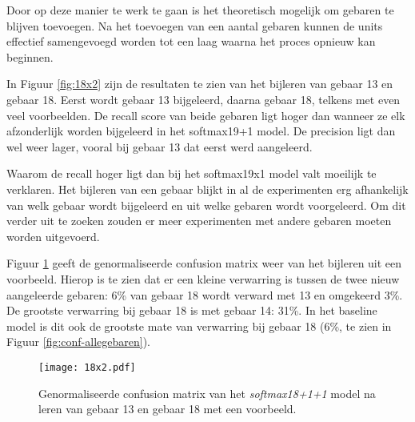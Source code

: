 \npar Door op deze manier te werk te gaan is het theoretisch mogelijk om gebaren te blijven toevoegen. Na het toevoegen van een aantal gebaren kunnen de units effectief samengevoegd worden tot een laag waarna het proces opnieuw kan beginnen.

\npar In Figuur \ref{fig:18x2} zijn de resultaten te zien van het bijleren van gebaar 13 en gebaar 18. Eerst wordt gebaar 13 bijgeleerd, daarna gebaar 18, telkens met even veel voorbeelden. De recall score van beide gebaren ligt hoger dan wanneer ze elk afzonderlijk worden bijgeleerd in het softmax19+1 model. De precision ligt dan wel weer lager, vooral bij gebaar 13 dat eerst werd aangeleerd.

\npar Waarom de recall hoger ligt dan bij het softmax19x1 model valt moeilijk te verklaren. Het bijleren van een gebaar blijkt in al de experimenten erg afhankelijk van welk gebaar wordt bijgeleerd en uit welke gebaren wordt voorgeleerd. Om dit verder uit te zoeken zouden er meer experimenten met andere gebaren moeten worden uitgevoerd.

\npar Figuur \ref{fig:conf-18x2} geeft de genormaliseerde confusion matrix weer van het bijleren uit een voorbeeld. Hierop is te zien dat er een kleine verwarring is tussen de twee nieuw aangeleerde gebaren: 6\% van gebaar 18 wordt verward met 13 en omgekeerd 3\%. De grootste verwarring bij gebaar 18 is met gebaar 14: 31\%. In het baseline model is dit ook de grootste mate van verwarring bij gebaar 18 (6\%, te zien in Figuur \ref{fig:conf-allegebaren}).


\begin{figure}
	\centering
	\texttt{[image: 18x2.pdf]}
	\caption{Precision en recall na het bijleren van gebaar 13 en gebaar 18 in het \textit{softmax18+1+1} model. Ter vergelijking is het resultaat van het \textit{softmax19+1} model ook uitgetekend.}\label{fig:18x2}
	\vspace{1.5cm}
	\def\svgwidth{0.8\columnwidth}
	
	\caption{Genormaliseerde confusion matrix van het \textit{softmax18+1+1} model na leren van gebaar 13 en gebaar 18 met een voorbeeld.}\label{fig:conf-18x2}
\end{figure}